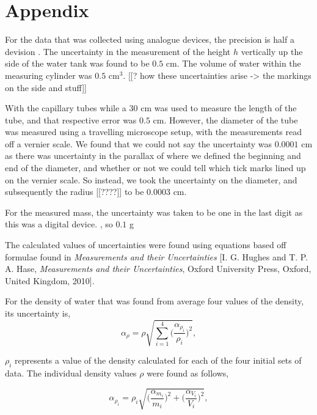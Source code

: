 \documentclass[twocolumn]{revtex4}
\begin{document}
\vfill
\twocolumngrid
\vspace{-3ex}
\section*{Appendix}
\vspace{-2ex}

For the data that was collected using analogue devices, the precision is half a devision \cite{crc}. The uncertainty in the measurement of the height $h$ vertically up the side of the water tank was found to be $0.5$ cm. The volume of water within the measuring cylinder was $0.5$ cm$^{3}$. [[? how these uncertainties arise -> the markings on the side and stuff]] 

With the capillary tubes while a $30$ cm was used to measure the length of the tube, and that respective error was $0.5$ cm. However, the diameter of the tube was measured using a travelling microscope setup, with the measurements read off a vernier scale. We found that we could not say the uncertainty was $0.0001$ cm as there was uncertainty in the parallax of where we defined the beginning and end of the diameter, and whether or not we could tell which tick marks lined up on the vernier scale. So instead, we took the uncertainty on the diameter, and subsequently the radius [[????]] to be $0.0003$ cm. 

For the measured mass, the uncertainty was taken to be one in the last digit as this was a digital device. \cite{crc}, so $0.1$ g

The calculated values of uncertainties were found using equations based off formulae found in \textit{Measurements and their Uncertainties} [I. G. Hughes and T. P. A. Hase, \textit{Measurements and their Uncertainties}, Oxford University Press, Oxford, United Kingdom, 2010].

For the density of water that was found from average four values of the density, its uncertainty is,
\begin{equation} 
\alpha_{\rho} = \rho \sqrt{ \sum_{i=1}^{4} \Big( \frac{\alpha_{\rho_i}}{\rho_i} \Big)^2 },
\label{ea-density}
\end{equation}

$\rho_i$ represents a value of the density calculated for each of the four initial sets of data. The individual density values $\rho$ were found as follows, 

\begin{equation} 
\alpha_{\rho_i} = \rho_i \sqrt{ \Bigg( \frac{\alpha_{m_i}}{m_i} \Bigg)^2 + \Bigg( \frac{\alpha_{V_i}}{V_i} \Bigg)^2 },
\label{ea-rho}
\end{equation}
\end{document}
